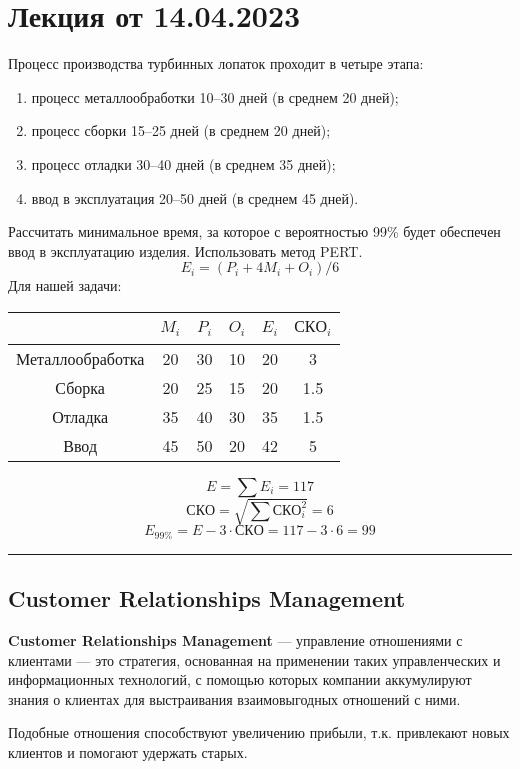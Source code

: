 \section{Лекция от 14.04.2023}
Процесс производства турбинных лопаток проходит в четыре этапа:
\begin{enumerate}
  \item процесс металлообработки 10--30 дней (в среднем 20 дней);
  \item процесс сборки 15--25 дней (в среднем 20 дней);
  \item процесс отладки 30--40 дней (в среднем 35 дней);
  \item ввод в эксплуатация 20--50 дней (в среднем 45 дней).
\end{enumerate}
Рассчитать минимальное время, за которое с вероятностью 99\% будет обеспечен ввод
в эксплуатацию изделия. Использовать метод PERT.
\[
  E_i = (P_i + 4 M_i + O_i) / 6
\] 
Для нашей задачи:
\begin{center}
  \begin{tabular}{|c|c|c|c|c|c|}
    \hline
    \ & $M_i$ & $P_i$  & $O_i$ & $E_i$ & $СКО_i$\\
    \hline
    Металлообработка & 20 & 30 & 10 & 20 & 3\\
    Сборка & 20 & 25 & 15 & 20 & 1.5 \\
    Отладка & 35 & 40 & 30 & 35 & 1.5 \\
    Ввод & 45 & 50 & 20 & 42 & 5 \\
    \hline
  \end{tabular}
\end{center}
\[
  E = \sum E_i = 117
\] 
\[
  СКО = \sqrt{\sum СКО_i^2} = 6
\] 
\[
  E_{99\%} = E - 3\cdot СКО = 117 - 3\cdot 6 = 99
\] 

\rule{\textwidth}{0.4pt}

\subsection{Customer Relationships Management}

\textbf{Customer Relationships Management} --- управление отношениями с
клиентами --- это стратегия, основанная на применении таких управленческих и
информационных технологий, с помощью которых компании аккумулируют знания о
клиентах для выстраивания взаимовыгодных отношений с ними.

Подобные отношения способствуют увеличению прибыли, т.к. привлекают новых
клиентов и помогают удержать старых.

